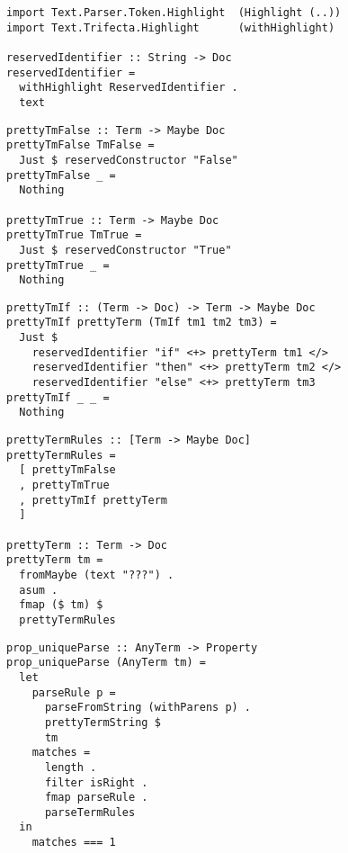 \documentclass{beamer}
\begin{document}
\begin{frame}[fragile]
  \begin{verbatim}
import Text.Parser.Token.Highlight  (Highlight (..))
import Text.Trifecta.Highlight      (withHighlight)

reservedIdentifier :: String -> Doc
reservedIdentifier =
  withHighlight ReservedIdentifier .
  text
  \end{verbatim}
\end{frame} 

\begin{frame}[fragile]
  \begin{verbatim}
prettyTmFalse :: Term -> Maybe Doc
prettyTmFalse TmFalse =
  Just $ reservedConstructor "False"
prettyTmFalse _ =
  Nothing

prettyTmTrue :: Term -> Maybe Doc
prettyTmTrue TmTrue =
  Just $ reservedConstructor "True"
prettyTmTrue _ =
  Nothing
  \end{verbatim}
\end{frame} 

\begin{frame}[fragile]
  \begin{verbatim}
prettyTmIf :: (Term -> Doc) -> Term -> Maybe Doc
prettyTmIf prettyTerm (TmIf tm1 tm2 tm3) =
  Just $
    reservedIdentifier "if" <+> prettyTerm tm1 </>
    reservedIdentifier "then" <+> prettyTerm tm2 </>
    reservedIdentifier "else" <+> prettyTerm tm3
prettyTmIf _ _ =
  Nothing
  \end{verbatim}
\end{frame} 

\begin{frame}[fragile]
  \begin{verbatim}
prettyTermRules :: [Term -> Maybe Doc]
prettyTermRules =
  [ prettyTmFalse
  , prettyTmTrue
  , prettyTmIf prettyTerm
  ]

prettyTerm :: Term -> Doc
prettyTerm tm =
  fromMaybe (text "???") .
  asum .
  fmap ($ tm) $
  prettyTermRules
  \end{verbatim}
\end{frame} 

\begin{frame}[fragile]
  \begin{verbatim}
prop_uniqueParse :: AnyTerm -> Property
prop_uniqueParse (AnyTerm tm) =
  let
    parseRule p = 
      parseFromString (withParens p) .
      prettyTermString $
      tm
    matches =
      length .
      filter isRight .
      fmap parseRule .
      parseTermRules
  in
    matches === 1
  \end{verbatim}
\end{frame} 
\end{document}
